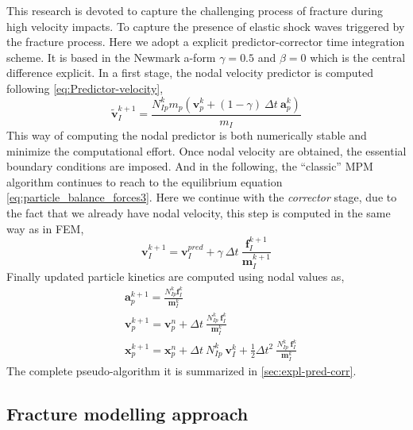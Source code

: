 \documentclass[preprint,12pt,a4paper]{elsarticle}
\newcommand{\vec}[1]{
  \ensuremath{\mathbf{{#1}}}
}
\newcommand{\tens}[1]{
  \ensuremath{\mathbf{{#1}}}
}
\begin{document}
This research is devoted to capture the challenging process of
fracture during high velocity impacts. To capture the presence of
elastic shock waves triggered by the fracture process. Here we adopt
a explicit predictor-corrector time integration
scheme. It is based in the Newmark a-form 
$\gamma = 0.5$ and $\beta = 0$ which is the central difference
explicit. In a first stage, the nodal velocity predictor is computed
following \eqref{eq:Predictor-velocity}, 
\begin{equation}
  \label{eq:Predictor-velocity}
  \vec{\tilde{v}}_I^{k+1} = \frac{ N_{Ip}^{k} m_p (\vec{v}_p^k + (1 - \gamma)\ \Delta t\ \vec{a}_p^k)}{m_I}
\end{equation}
This way of computing the nodal predictor is both numerically stable
and minimize the computational effort. Once nodal velocity are
obtained, the essential boundary conditions are imposed. And in the
following, the ``classic'' MPM algorithm continues to reach to the
equilibrium equation \eqref{eq:particle_balance_forces3}. Here we
continue with the \textit{corrector} stage, due to the fact that we
already have nodal velocity, this step is computed in the same way as
in FEM,
\begin{equation}
  \label{eq:Corrector-velocity}
  \vec{v}_{I}^{k+1} = \vec{v}_{I}^{pred} + \gamma\ \Delta t\ \frac{\vec{f}_{I}^{k+1}}{\tens{m}_I^{k+1}}
\end{equation}
Finally updated particle kinetics are computed using nodal values as,
\begin{align}
  \label{eq:Update-lagrangian-pce}
        &\vec{a}_p^{k+1} = \frac{N_{Ip}^k\vec{f}_{I}^{k}}{\tens{m}_I^k}\\
      &\vec{v}_p^{k+1} = \vec{v}_p^n + \Delta t\
        \frac{N_{Ip}^k\
        \vec{f}_{I}^{k}}{\tens{m}_I^k}\\
      &\vec{x}_p^{k+1} = \vec{x}_p^n + \Delta t\
         N_{Ip}^k\ \vec{v}_{I}^{k} +
        \frac{1}{2}\Delta t^2\ \frac{N_{Ip}^k\
        \vec{f}_{I}^{k}}{\tens{m}_I^k} 
\end{align}
The complete pseudo-algorithm it is summarized in \ref{sec:expl-pred-corr}.

\subsection{Fracture modelling approach}
\label{sec:2.4}
\end{document}
